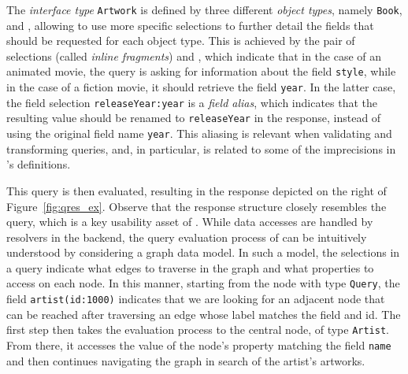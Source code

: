 The {\em interface
type} \texttt{Artwork} is defined by three different {\em object types},
namely \texttt{Book}, \fiction and \animation, allowing to use more specific
selections to further detail the fields that should be requested for
each object type. 
This is achieved by the pair of selections (called {\em inline fragments})
 and , which indicate that in the case of an 
  animated movie, the query is asking for information about the field
\texttt{style}, while in the case of a fiction movie, it should
retrieve the field \texttt{year}. In the latter case, the field selection
\texttt{releaseYear:year} is a {\em field alias}, which indicates that
the resulting value should be renamed to \texttt{releaseYear} in the response, instead of using the original field name \texttt{year}.
This aliasing is relevant when validating and transforming queries, and, in particular, 
is related to some of the imprecisions in \HP's definitions.
\fi 

\iffalse
Because the {\em interface
type} \texttt{Animal} is implemented by two different {\em object types},
namely \texttt{Dog} and \texttt{Pig}, one can use more specific
selections to further specify the fields that should be requested for
each object type. 
This is achieved by the pair of selections (called {\em inline fragments})
\ifrag{Dog}{\texttt{ favoriteToy \{ chewiness \} }} and \ifrag{Pig}{
  \texttt{loudness:oink} }, which indicate that in the case of a 
dog, the query should request information about field
\texttt{favoriteToy}, while in the case of a pig, the query should
retrieve field \texttt{oink}. In this case, the field selection
\texttt{loudness:oink} is a {\em field alias}, which indicates that
the resulting value should be renamed to \texttt{loudness} in the response, instead of using the original field name \texttt{oink}.  
\fi

This query is then evaluated, resulting in the response
depicted on the right of Figure~\ref{fig:qres_ex}. Observe that the
response structure closely
resembles the query, which is a key usability asset of \gql.
While data accesses are handled by resolvers in the backend, the query evaluation process of \gql can be intuitively understood by considering a graph data model. In such a model, the selections in a query indicate what edges to traverse in the graph and what properties to access on each node. In this manner, starting from the node with type \texttt{Query}, the field \texttt{artist(id:1000)} indicates that 
we are looking for an adjacent node that can be reached after traversing an edge whose label matches the
field and id. The first step then takes the evaluation process to the central
node, of type \texttt{Artist}. From there, it accesses the value
of the node's property matching the field \texttt{name} and then
continues navigating the graph in search of the artist's artworks.

